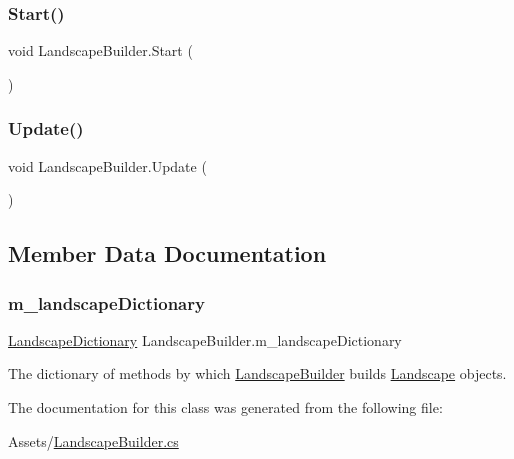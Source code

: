 \subsubsection{\texorpdfstring{Start()}{Start()}}
{\footnotesize\ttfamily void Landscape\+Builder.\+Start (\begin{DoxyParamCaption}{ }\end{DoxyParamCaption})\hspace{0.3cm}{\ttfamily [private]}}

\mbox{\label{class_landscape_builder_a117e41633ea31c2c25abce388a46465d}} 
\subsubsection{\texorpdfstring{Update()}{Update()}}
{\footnotesize\ttfamily void Landscape\+Builder.\+Update (\begin{DoxyParamCaption}{ }\end{DoxyParamCaption})\hspace{0.3cm}{\ttfamily [private]}}



\subsection{Member Data Documentation}
\mbox{\label{class_landscape_builder_ab732ac4dd39fe671a30e3a614a1c65b9}} 
\subsubsection{\texorpdfstring{m\+\_\+landscape\+Dictionary}{m\_landscapeDictionary}}
{\footnotesize\ttfamily \hyperlink{class_landscape_dictionary}{Landscape\+Dictionary} Landscape\+Builder.\+m\+\_\+landscape\+Dictionary\hspace{0.3cm}{\ttfamily [private]}}



The dictionary of methods by which \hyperlink{class_landscape_builder}{Landscape\+Builder} builds \hyperlink{class_landscape}{Landscape} objects. 



The documentation for this class was generated from the following file\+:\begin{DoxyCompactItemize}
\item 
Assets/\hyperlink{_landscape_builder_8cs}{Landscape\+Builder.\+cs}\end{DoxyCompactItemize}
